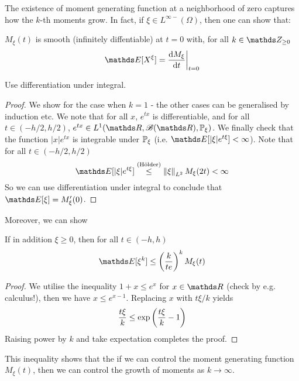 \begin{unexaminable}
The existence of moment generating function at a neighborhood of zero captures how the $k$-th moments grow. In fact, if $\xi \in L^{\infty-}(\Omega)$, then one can show that:
\begin{proposition}
$M_\xi(t)$ is smooth (infinitely diffentiable) at $t = 0$ with, for all $k \in \Z_{\geq 0}$
\begin{equation}
    \E[X^\xi] = \frac{\d M_\xi}{\d t} \bigg|_{t=0}
\end{equation}
\end{proposition}

\begin{hint}
Use differentiation under integral.
\end{hint}

\begin{proof} We show for the case when $k = 1$ - the other cases can be generalised by induction etc. We note that for all $x$, $e^{tx}$ is differentiable, and for all $t \in (-h/2,h/2)$, $e^{tx} \in L^1(\R, \B(\R), \p_\xi)$. We finally check that the function $|x|e^{tx}$ is integrable under $\mathbb{P}_\xi$ (i.e. $\E[|\xi|e^{t\xi}] < \infty$). Note that for all $t \in (-h/2,h/2)$
\begin{equation} \label{eq:Holder_MGF}
    \E[|\xi|e^{t\xi}] \overset{\text{(Hölder)}}{\leq} \norm{\xi}_{L^2} M_\xi(2t) < \infty
\end{equation}
So we can use differentiation under integral to conclude that $\E[\xi] = M_\xi'(0)$.
\end{proof}

Moreover, we can show 
\begin{proposition} If in addition $\xi \geq 0$, then for all $t \in (-h,h)$
\begin{equation}
    \E[\xi^k] \leq \bracket{\frac{k}{te}}^k M_\xi(t)
\end{equation}
\end{proposition}

\begin{proof}
We utilise the inequality $1+x \leq e^{x}$ for $x \in \R$ (check by e.g. calculus!), then we have $x \leq e^{x-1}$. Replacing $x$ with $t\xi/k$ yields
\begin{equation}
    \frac{t\xi}{k} \leq \exp\left( \frac{t\xi}{k}-1 \right)
\end{equation}
Raising power by $k$ and take expectation completes the proof.
\end{proof}

This inequality shows that the if we can control the moment generating function $M_\xi(t)$, then we can control the growth of moments as $k \to \infty$.
\end{unexaminable}

